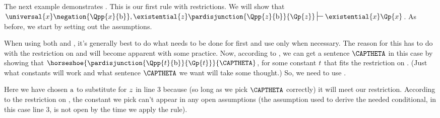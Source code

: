 The next example demonstrates . 
This is our first rule with restrictions.
We will show that $\universal{\variable{x}}\negation{\Qpp{\variable{x}}{\constant{b}}},\existential{\variable{z}}\pardisjunction{\Qpp{\variable{z}}{\constant{b}}}{\Gp{\variable{z}}}\sststile{}{}\existential{\variable{x}}\Gp{\variable{x}}$.
As before, we start by setting out the assumptions. 
\begin{gproof}[\label{GQDExampleH}]
\end{gproof}
When using both  and , it's generally best to do what needs to be done for  first and use  only when necessary.
The reason for this has to do with the restriction on  and will become apparent with some practice. 
Now, according to , we can get a sentence $\CAPTHETA$ in this case by showing that $\horseshoe{\pardisjunction{\Qpp{\variable{t}}{\constant{b}}}{\Gp{\variable{t}}}}{\CAPTHETA}$, for some constant $t$ that fits the restriction on .
(Just what constants will work and what sentence $\CAPTHETA$ we want will take some thought.)
So, we need to use . 
\begin{gproof}[\label{GQDExampleI}]
\end{gproof}
Here we have chosen $\mathrm{a}$ to substitute for $z$ in line 3 because (so long as we pick $\CAPTHETA$ correctly) it will meet our restriction. 
According to the restriction on , the constant we pick can't appear in any open assumptions (the assumption used to derive the needed conditional, in this case line 3, is not open by the time we apply the rule). 

